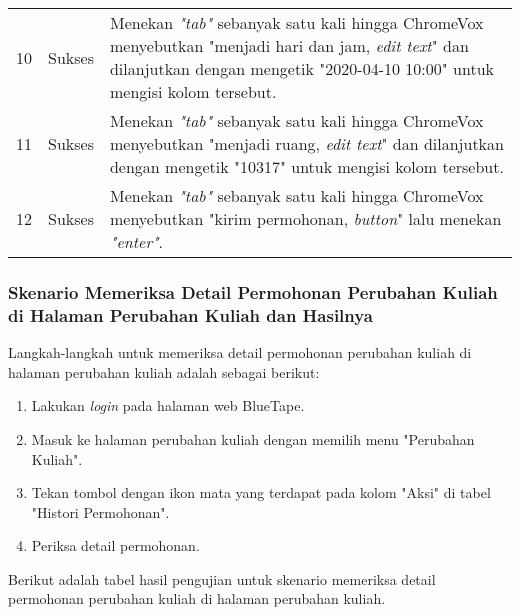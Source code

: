 \begin{table}[H]
\begin{tabular}{|c|c|p{10cm}|}
        10 & Sukses & Menekan \textit{"tab"} sebanyak satu kali hingga ChromeVox menyebutkan "menjadi hari dan jam, \textit{edit text}" dan dilanjutkan dengan mengetik "2020-04-10 10:00" untuk mengisi kolom tersebut. \\
        11 & Sukses & Menekan \textit{"tab"} sebanyak satu kali hingga ChromeVox menyebutkan "menjadi ruang, \textit{edit text}" dan dilanjutkan dengan mengetik "10317" untuk mengisi kolom tersebut. \\
        12 & Sukses & Menekan \textit{"tab"} sebanyak satu kali hingga ChromeVox menyebutkan "kirim permohonan, \textit{button}" lalu menekan \textit{"enter"}. \\

        \bottomrule

    \end{tabular}
\end{table}

\subsubsection{Skenario Memeriksa Detail Permohonan Perubahan Kuliah di Halaman Perubahan Kuliah dan Hasilnya}
\label{subsubsec:skenario_memeriksa_detail_permohonan_perubahan_kuliah_di_halaman_perubahan_kuliah}
Langkah-langkah untuk memeriksa detail permohonan perubahan kuliah di halaman perubahan kuliah adalah sebagai berikut:

\begin{enumerate}
    \item Lakukan \textit{login} pada halaman web BlueTape.
    \item Masuk ke halaman perubahan kuliah dengan memilih menu "Perubahan Kuliah".
    \item Tekan tombol dengan ikon mata yang terdapat pada kolom "Aksi" di tabel "Histori Permohonan".
    \item Periksa detail permohonan.
\end{enumerate}

Berikut adalah tabel hasil pengujian untuk skenario memeriksa detail permohonan perubahan kuliah di halaman perubahan kuliah.

